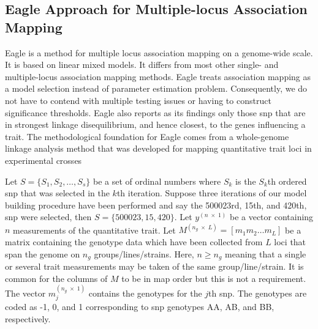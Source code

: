 \documentclass{nature}
\begin{document}
\subsection{Eagle Approach for Multiple-locus Association Mapping}

Eagle is a method for multiple locus association mapping on a genome-wide scale. It is based on linear mixed models. It differs from most other single- and multiple-locus association mapping methods. Eagle treats association mapping as a model selection instead of parameter estimation problem. Consequently,  we do not have to contend with multiple testing issues or having to construct significance thresholds.  
Eagle also 
reports as its findings only those snp that are in strongest linkage disequilibrium, and hence closest, to the genes influencing a trait. 
The methodological foundation for Eagle comes from a whole-genome linkage analysis method that was developed for mapping 
quantitative trait loci in experimental crosses \cite{verbyla2007analysis} 


Let $S = \{ S_1, S_2, \ldots, S_s\}$ be a set of ordinal numbers where $S_k$ is the $S_k$th ordered snp that was 
selected in the $k$th iteration. Suppose three iterations of our model building procedure 
have been performed and say the 500023rd, 15th, and 420th, 
snp were selected, then $S=\{500023, 15, 420\}$. 
Let $y^{(n \; \times \;1)}$ be a vector containing $n$ measurements of the quantitative trait. 
Let $M^{(n_g \; \times \; L)} = [m_1 m_2 \ldots m_L]$ be a matrix containing the genotype data which have been collected 
from $L$ loci that span the genome on $n_g$ groups/lines/strains.  Here, $n \geq n_g$ meaning that a single or several trait measurements 
may be taken of the same group/line/strain. 
 It is common for the columns of $M$ to be in map order but this is not a requirement. 
The vector $m_j^{(n_g \; \times \; 1)}$ contains the genotypes for the $j$th snp. 
The genotypes are coded as -1, 0, and 1 corresponding to snp genotypes AA, AB, and BB, respectively. 
\end{document}
